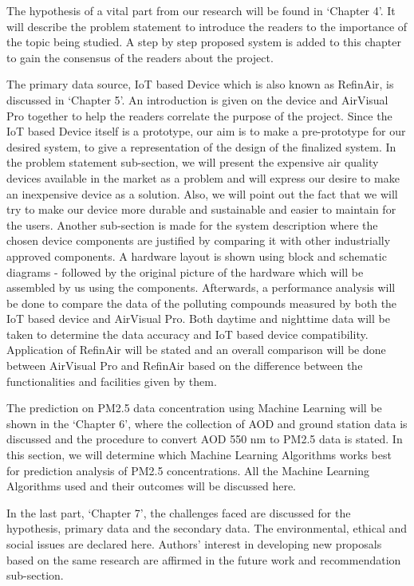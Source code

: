 The hypothesis of a vital part from our research will be found in ‘Chapter 4’. It will describe the problem statement to introduce the readers to the importance of the topic being studied. A step by step proposed system is added to this chapter to gain the consensus of the readers about the project. 

The primary data source, IoT based Device which is also known as RefinAir, is discussed in ‘Chapter 5’. An introduction is given on the device and AirVisual Pro together to help the readers correlate the purpose of the project. Since the IoT based Device itself is a prototype, our aim is to make a pre-prototype for our desired system, to give a representation of the design of the finalized system. In the problem statement sub-section, we will present the expensive air quality devices available in the market as a problem and will express our desire to make an inexpensive device as a solution. Also, we will point out the fact that we will try to make our device more durable and sustainable and easier to maintain for the users. Another sub-section is made for the system description where the chosen device components are justified by comparing it with other industrially approved components. A hardware layout is shown using block and schematic diagrams - followed by the original picture of the hardware which will be assembled by us using the components. Afterwards, a performance analysis will be done to compare the data of the polluting compounds measured by both the IoT based device and AirVisual Pro. Both daytime and nighttime data will be taken to determine the data accuracy and IoT based device compatibility. Application of RefinAir will be stated and an overall comparison will be done between AirVisual Pro and RefinAir based on the difference between the functionalities and facilities given by them.

The prediction on  PM2.5 data concentration using Machine Learning will be shown in the ‘Chapter 6’, where the collection of AOD and ground station data is discussed and the procedure to convert AOD 550 nm to PM2.5 data is stated. In this section, we will determine which Machine Learning Algorithms works best for prediction analysis of PM2.5 concentrations. All the Machine Learning Algorithms used and their outcomes will be discussed here.

In the last part, ‘Chapter 7’, the challenges faced are discussed for the hypothesis, primary data and the secondary data. The environmental, ethical and social issues are declared here. Authors’ interest in developing new proposals based on the same research are affirmed in the future work and recommendation sub-section.
